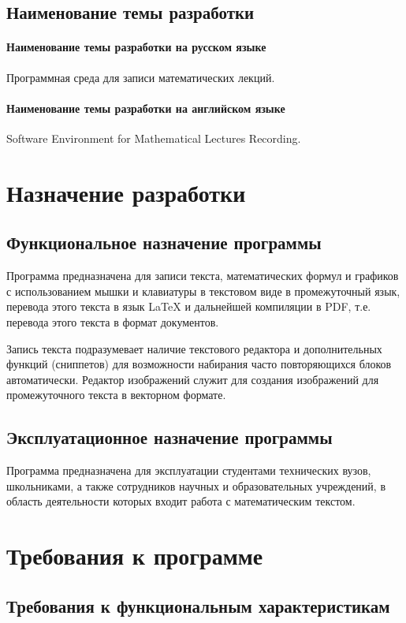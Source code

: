 \documentclass[techtask]{espd}
\begin{document}
\subsection{Наименование темы разработки}
\paragraph{Наименование темы разработки на русском языке}
Программная среда для записи математических лекций.

\paragraph{Наименование темы разработки на английском языке}
Software Environment for Mathematical Lectures Recording.

\section{Назначение разработки}
\subsection{Функциональное назначение программы}
Программа предназначена для записи текста, математических формул и графиков с использованием мышки и клавиатуры в текстовом виде в промежуточный язык, перевода этого текста в язык LaTeX и дальнейшей компиляции в PDF, т.е. перевода этого текста в формат документов.

Запись текста подразумевает наличие текстового редактора и дополнительных функций (сниппетов) для возможности набирания часто повторяющихся блоков автоматически. Редактор изображений служит для создания изображений для промежуточного текста в векторном формате.

\subsection{Эксплуатационное назначение программы}
Программа предназначена для эксплуатации студентами технических вузов, школьниками, а также сотрудников научных и образовательных учреждений, в область деятельности которых входит работа с математическим текстом.

\section{Требования к программе}
\subsection{Требования к функциональным характеристикам}
\end{document}
